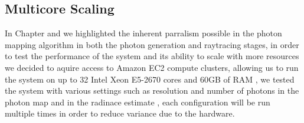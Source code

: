 \subsection{Multicore Scaling}
In Chapter  and  we highlighted the inherent parralism possible in the
photon mapping algorithm in both the photon generation and raytracing stages, in order to
test the performance of the system and its ability to scale with more resources we decided to
aquire access to Amazon EC2 compute clusters, allowing us to run the system on up to 32 Intel
Xeon E5-2670 cores and 60GB of RAM \cite{amazon-instances}, we tested the system with various
settings such as resolution and number of photons in the photon map and in the radinace estimate
, each configuration will be run multiple times in order to reduce variance due to the hardware.


